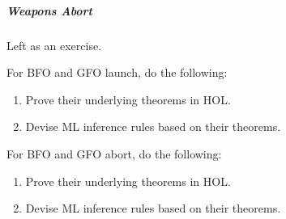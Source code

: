 \subparagraph*{Weapons Abort}

Left as an exercise.


\begin{exercise}[\synthesis]
  For BFO and GFO launch, do the following:
  \begin{enumerate}[{A.}]
  \item Prove their underlying theorems in HOL.
  \item Devise ML inference rules based on their theorems.
  \end{enumerate}
\end{exercise}

\begin{exercise}[\synthesis]
  For BFO and GFO abort, do the following:
  \begin{enumerate}[{A.}]
  \item Prove their underlying theorems in HOL.
  \item Devise ML inference rules based on their theorems.
  \end{enumerate}
\end{exercise}

